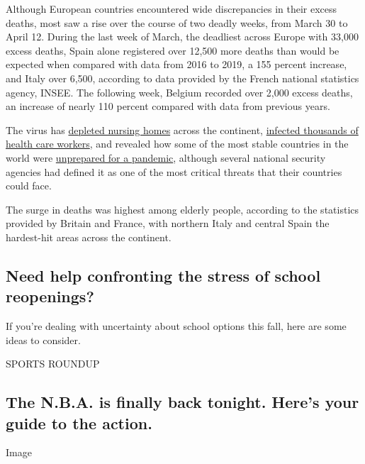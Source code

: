 Although European countries encountered wide discrepancies in their
excess deaths, most saw a rise over the course of two deadly weeks, from
March 30 to April 12. During the last week of March, the deadliest
across Europe with 33,000 excess deaths, Spain alone registered over
12,500 more deaths than would be expected when compared with data from
2016 to 2019, a 155 percent increase, and Italy over 6,500, according to
data provided by the French national statistics agency, INSEE. The
following week, Belgium recorded over 2,000 excess deaths, an increase
of nearly 110 percent compared with data from previous years.

The virus has
\href{https://www.nytimes.com/2020/03/25/world/europe/Spain-coronavirus-nursing-homes.html}{depleted
nursing homes} across the continent,
\href{https://www.nytimes.com/2020/03/03/world/europe/coronavirus-health-workers-uk.html}{infected
thousands of health care workers}, and revealed how some of the most
stable countries in the world were
\href{https://www.nytimes.com/2020/07/20/world/europe/coronavirus-mistakes-france-uk-italy.html}{unprepared
for a pandemic}, although several national security agencies had defined
it as one of the most critical threats that their countries could face.

The surge in deaths was highest among elderly people, according to the
statistics provided by Britain and France, with northern Italy and
central Spain the hardest-hit areas across the continent.

\hypertarget{need-help-confronting-the-stress-of-school-reopenings}{%
\subsection{Need help confronting the stress of school
reopenings?}\label{need-help-confronting-the-stress-of-school-reopenings}}

If you're dealing with uncertainty about school options this fall, here
are some ideas to consider.

SPORTS ROUNDUP

\hypertarget{the-nba-is-finally-back-tonight-heres-your-guide-to-the-action}{%
\subsection{The N.B.A. is finally back tonight. Here's your guide to the
action.}\label{the-nba-is-finally-back-tonight-heres-your-guide-to-the-action}}

Image

